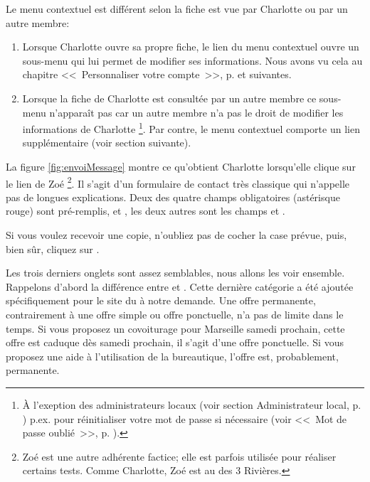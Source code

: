 Le menu contextuel est différent selon la fiche est vue par Charlotte ou par un autre membre:
\begin{enumerate}
    \item Lorsque Charlotte ouvre sa propre fiche, le lien  du menu contextuel ouvre un sous-menu qui lui permet de modifier ses informations. Nous avons vu cela au chapitre <<~Personnaliser votre compte~>>, p. \pageref{chap:personnaliserCompte} et suivantes.
    \item Lorsque la fiche de Charlotte est consultée par un autre membre ce sous-menu n'apparaît pas car un autre membre n'a pas le droit de modifier les informations de Charlotte%
    \footnote{À l'exeption des administrateurs locaux (voir section \og{}Administrateur local\fg{}, p. \pageref{sec:adminLocal}) p.ex. pour réinitialiser votre mot de passe si nécessaire (voir <<~Mot de passe oublié~>>, p. \pageref{sec:mdpOublie}).}.
    Par contre, le menu contextuel comporte un lien  supplémentaire (voir section suivante).
\end{enumerate}

\label{page:envoyerCourrielMembre}

La figure \ref{fig:envoiMessage}  montre ce qu’obtient Charlotte lorsqu’elle clique sur le lien  de Zoé%
\footnote{Zoé est une autre adhérente factice; elle est parfois utilisée pour réaliser certains tests. Comme Charlotte, Zoé est  au \sel{} des 3 Rivières.}.
Il s’agit d’un formulaire de contact très classique qui n’appelle pas de longues explications. Deux des quatre champs obligatoires (astérisque rouge) sont pré-remplis,  et , les deux autres sont les champs  et .

Si vous voulez recevoir une copie, n'oubliez pas de cocher la case prévue, puis, bien sûr, cliquez sur .
 


Les trois derniers onglets sont assez semblables, nous allons les voir ensemble.
\label{page:typesOffres}Rappelons d’abord la différence entre  et . Cette dernière catégorie a été ajoutée spécifiquement pour le site du \CdS{} à notre demande. Une offre permanente, contrairement à une offre simple ou offre ponctuelle, n’a pas de limite dans le temps. Si vous proposez un covoiturage pour Marseille samedi prochain, cette offre est caduque dès samedi prochain, il s’agit d’une offre ponctuelle. Si vous proposez une aide à l’utilisation de la bureautique, l’offre est, probablement, permanente.

